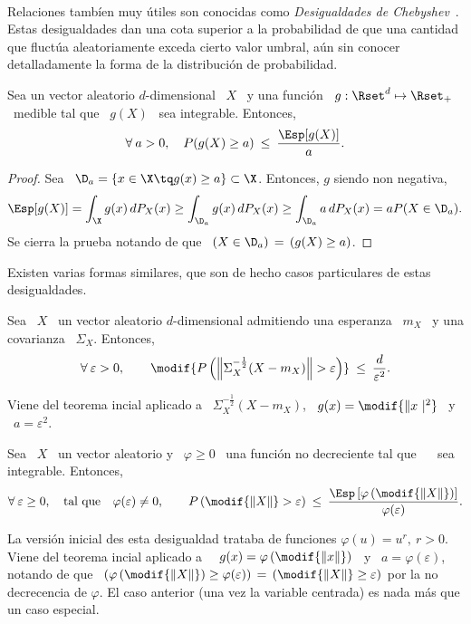 \

Relaciones  tamb\'ien muy  \'utiles  son conocidas  como  {\it Desigualdades  de
  Chebyshev}~\cite{Bie53,  Tch67,  Mar84,  OlkPra58,  Fer82,  Nav13,  StePar17}.
Estas desigualdades dan una cota superior  a la probabilidad de que una cantidad
que  fluct\'ua aleatoriamente  exceda  cierto valor  umbral,  a\'un sin  conocer
detalladamente la forma de la distribuci\'on de probabilidad.
%
\begin{teorema}
\label{Teo:MP:Chebyshev}
%
  Sea un vector aleatorio $d$-dimensional \  $X$ \ y una funci\'on \ $g: \Rset^d
  \mapsto \Rset_+$ \ medible tal que \ $g(X)$ \ sea integrable. Entonces,
  \[
  \forall \: a > 0, \quad P(g(X) \ge a) \: \le \: \frac{\Esp[g(X)]}{a}.
  \]
\end{teorema}
%
\begin{proof}
  Sea \ $\D_a = \{ x \in \X \tq  g(x) \ge a \} \subset \X$. Entonces, $g$ siendo
  non negativa,
  \[
  \Esp[g(X)]  = \int_\X  g(x) \,  dP_X(x) \ge  \int_{\D_a} g(x)  \,  dP_X(x) \ge
  \int_{\D_a} a \, dP_X(x) = a P(X \in \D_a).
  \]
  Se cierra la prueba notando de que \ $(X \in \D_a) \, = \, (g(X) \ge a)$.
\end{proof}
%
Existen varias  formas similares, que son  de hecho casos  particulares de estas
desigualdades.
%
\begin{corolario}
\label{Cor:MP:BienaymeChebyshev}
%
  Sea \  $X$ \  un vector aleatorio  $d$-dimensional admitiendo una  esperanza \
  $m_X$ \ y una covarianza \ $\Sigma_X$. Entonces,
  \[
  \forall \:  \varepsilon > 0,  \qquad \modif{P\left( \left\| \Sigma_X^{-\frac12}  (X -
      m_X) \right\| > \varepsilon \right)} \: \le \: \frac{d}{\varepsilon^2}.
 \]
\end{corolario}
%
Viene del teorema incial aplicado a \ $\Sigma_X^{-\frac12} (X - m_X)$, \ $g(x)
= \modif{\| x\ |^2}$ \ y \ $a = \varepsilon^2$.
%
\begin{corolario}[Markov]
\label{Cor:MP:Markov}
%
  Sea \ $X$ \ un vector aleatorio y \ $\varphi \ge 0$ \ una funci\'on no decreciente
  tal que \ \modif{$\varphi(\|X\|)$} \ sea integrable. Entonces,
  \[
  \forall \: \varepsilon \ge  0, \quad \mbox{tal que} \quad \varphi(\varepsilon)
  \ne  0,  \qquad P\left(  \modif{\|  X  \|} >  \varepsilon  \right)  \: \le  \:
  \frac{\Esp\left[      \varphi\left(      \modif{\|      X     \|}      \right)
    \right]}{\varphi(\varepsilon)}.
 \]
\end{corolario}
%
La versi\'on  inicial des  esta desigualdad trataba  de funciones  $\varphi(u) =
u^r, \: r  > 0$. Viene del teorema  incial aplicado a \ \  $g(x) = \varphi\left(
  \modif{\| x  \|} \right)$ \ y \  $a = \varphi(\varepsilon)$, notando  de que \
$\left( \varphi\left( \modif{\|X\|}  \right) \ge \varphi(\varepsilon) \right) \,
= \,  \left( \modif{\| X \|} \ge  \varepsilon \right)$ por la  no decrecencia de
$\varphi$. El caso anterior (una vez  la variable centrada) es nada m\'as que un
caso especial.

